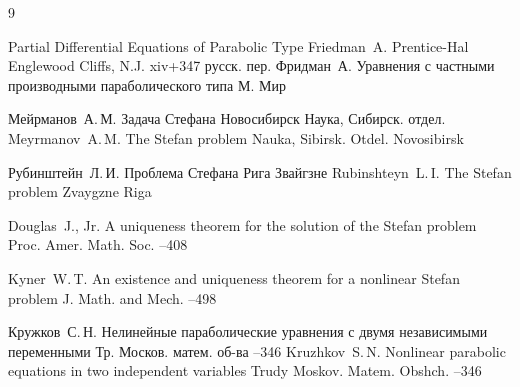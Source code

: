 \begin{thebibliography}{9}

\book Partial Differential Equations of Parabolic Type
\by Friedman~A.
\publ Prentice-Hal
\publaddr Englewood Cliffs, N.J.
\totalpages xiv+347
\rtransl русск. пер. 
\by Фридман~А.
\book Уравнения с частными производными параболического типа
\publaddr М.
\publ Мир

\by Мейрманов~А.\,М.
\book Задача Стефана
\publaddr Новосибирск
\publ Наука, Сибирск. отдел.
\misctransl 
\by Meyrmanov~A.\,M. 
\book The Stefan problem
\publ Nauka, Sibirsk. Otdel.
\publaddr Novosibirsk


\by Рубинштейн~Л.\,И.
\book Проблема Стефана
\publaddr Рига
\publ Звайгзне
\misctransl
\by Rubinshteyn~L.\,I.
\book The Stefan problem
\publ Zvaygzne
\publaddr Riga 

\by Douglas~J., Jr.
\paper A uniqueness theorem for the solution of the Stefan problem
\jour Proc. Amer. Math. Soc.
--408




\by Kyner~W.\,T.
\paper An existence and uniqueness theorem for a nonlinear Stefan problem
\jour J. Math. and Mech.
--498



\by Кружков~С.\,Н.
\paper Нелинейные параболические уравнения с двумя независимыми переменными
\jour Тр. Москов. матем. об-ва
--346
\misctransl
\by Kruzhkov~S.\,N.
\paper Nonlinear parabolic equations in two independent variables
\jour Trudy Moskov. Matem. Obshch.
--346


\end{thebibliography}
 
\noindent
\hskip6.5cm \thedate \par\noindent
\hskip6.5cm\therevdate

\vspace{-5mm}

\makeengtitle



 \newpage
%
%
%
